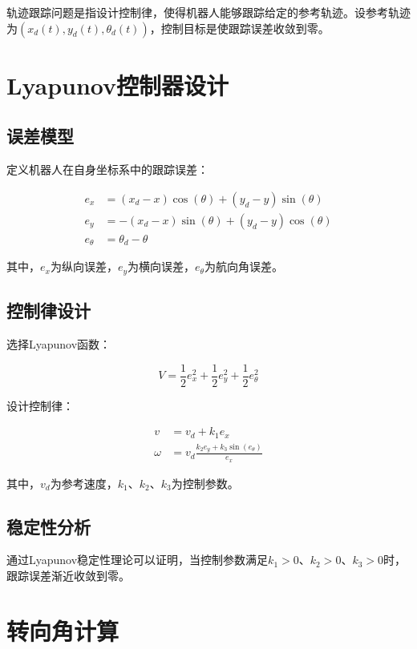 \documentclass[12pt,a4paper]{report}
\begin{document}
轨迹跟踪问题是指设计控制律，使得机器人能够跟踪给定的参考轨迹。设参考轨迹为$(x_d(t), y_d(t), \theta_d(t))$，控制目标是使跟踪误差收敛到零。

\section{Lyapunov控制器设计}

\subsection{误差模型}

定义机器人在自身坐标系中的跟踪误差：

\begin{align}
e_x &= (x_d - x)\cos(\theta) + (y_d - y)\sin(\theta) \\
e_y &= -(x_d - x)\sin(\theta) + (y_d - y)\cos(\theta) \\
e_\theta &= \theta_d - \theta
\end{align}

其中，$e_x$为纵向误差，$e_y$为横向误差，$e_\theta$为航向角误差。

\subsection{控制律设计}

选择Lyapunov函数：

\begin{equation}
V = \frac{1}{2}e_x^2 + \frac{1}{2}e_y^2 + \frac{1}{2}e_\theta^2
\end{equation}

设计控制律：

\begin{align}
v &= v_d + k_1 e_x \\
\omega &= v_d \frac{k_2 e_y + k_3 \sin(e_\theta)}{e_x}
\end{align}

其中，$v_d$为参考速度，$k_1$、$k_2$、$k_3$为控制参数。

\subsection{稳定性分析}

通过Lyapunov稳定性理论可以证明，当控制参数满足$k_1 > 0$、$k_2 > 0$、$k_3 > 0$时，跟踪误差渐近收敛到零。

\section{转向角计算}
\end{document}
